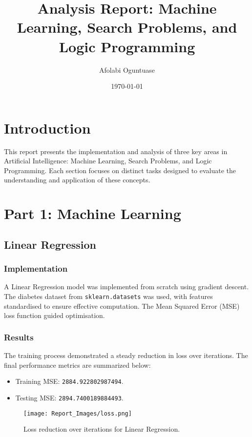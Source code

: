 \documentclass[12pt]{article}
\title{Analysis Report: Machine Learning, Search Problems, and Logic Programming}
\author{Afolabi Oguntuase}
\date{\today}
\begin{document}
\maketitle

\tableofcontents

\newpage

\section{Introduction}
This report presents the implementation and analysis of three key areas in Artificial Intelligence: 
Machine Learning, Search Problems, and Logic Programming. Each section focuses on distinct tasks 
designed to evaluate the understanding and application of these concepts.

\section{Part 1: Machine Learning}
\subsection{Linear Regression}
\subsubsection{Implementation}
A Linear Regression model was implemented from scratch using gradient descent. The diabetes dataset from \texttt{sklearn.datasets} was used, with features standardised to ensure effective computation. The Mean Squared Error (MSE) loss function guided optimisation.

\subsubsection{Results}
The training process demonstrated a steady reduction in loss over iterations. The final performance metrics are summarized below:
\begin{itemize}
    \item Training MSE: \texttt{2884.922802987494}.
    \item Testing MSE: \texttt{2894.7400189884493}.
\end{itemize}
\begin{figure}[h!]
    \centering
    \texttt{[image: Report\_Images/loss.png]}
    \caption{Loss reduction over iterations for Linear Regression.}
    \label{fig:loss_plot}
\end{figure}
\end{document}
